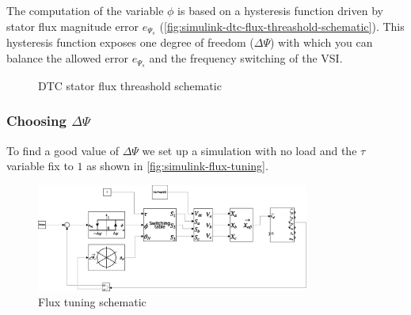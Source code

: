 The computation of the variable $\phi$ is based on a hysteresis function driven by stator flux magnitude error $e_{\Psi_s}$ (\autoref{fig:simulink-dtc-flux-threashold-schematic}).
This hysteresis function exposes one degree of freedom ($\Delta \Psi$) with which you can balance the allowed error $e_{\Psi_s}$ and the frequency switching of the VSI.

\begin{figure}[h!]
	\centering
	\qquad
	\caption{DTC stator flux threashold schematic}
	\label{fig:simulink-dtc-flux-threashold-schematic}
\end{figure}

\subsubsection{Choosing \texorpdfstring{$\Delta \Psi$}{dPsi}}\label{subsubsec:choosing-delta-psi}

To find a good value of $\Delta\Psi$ we set up a simulation with no load and the $\tau$ variable fix to $1$ as shown in \autoref{fig:simulink-flux-tuning}.

\begin{figure}[htbp]
	\centering
	\includegraphics[width=0.8\textwidth]{schematics/flux_tuning}
	\caption{Flux tuning schematic}
	\label{fig:simulink-flux-tuning}
\end{figure}

